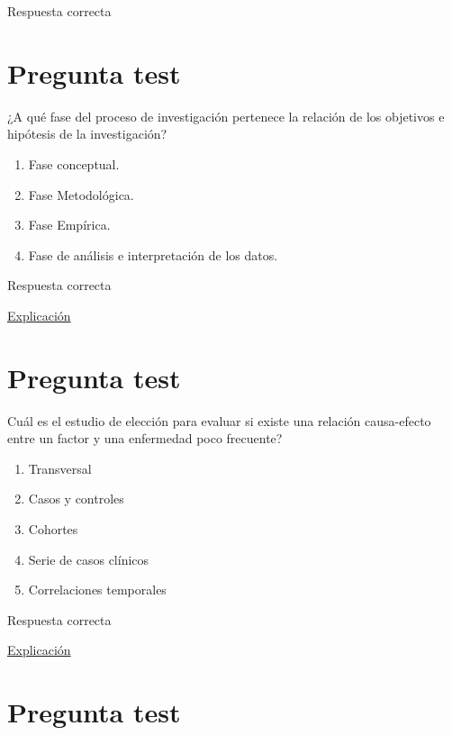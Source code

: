 \documentclass[
]{book}
\providecommand{\tightlist}{%
  \setlength{\itemsep}{0pt}\setlength{\parskip}{0pt}}
\begin{document}
Respuesta correcta

\hypertarget{pregunta-test-42}{%
\section{Pregunta test}\label{pregunta-test-42}}

¿A qué fase del proceso de investigación pertenece la relación de los objetivos e hipótesis de la investigación?

\begin{enumerate}
\def\labelenumi{\alph{enumi})}
\tightlist
\item
  Fase conceptual.
\item
  Fase Metodológica.
\item
  Fase Empírica.
\item
  Fase de análisis e interpretación de los datos.
\end{enumerate}

Respuesta correcta

\href{https://www.salusplay.com/apuntes/apuntes-metodologia-de-la-investigacion/tema-4-el-proceso-de-investigacion-fases-de-realizacion-de-una-investigacion-cientifica/2}{Explicación}

\hypertarget{pregunta-test-43}{%
\section{Pregunta test}\label{pregunta-test-43}}

Cuál es el estudio de elección para evaluar si existe una relación causa-efecto entre un factor y una enfermedad poco frecuente?

\begin{enumerate}
\def\labelenumi{\alph{enumi})}
\tightlist
\item
  Transversal
\item
  Casos y controles
\item
  Cohortes
\item
  Serie de casos clínicos
\item
  Correlaciones temporales
\end{enumerate}

Respuesta correcta

\href{http://www.scielo.org.pe/scielo.php?script=sci_arttext\&pid=S2308-05312020000100138}{Explicación}

\hypertarget{pregunta-test-44}{%
\section{Pregunta test}\label{pregunta-test-44}}
\end{document}

